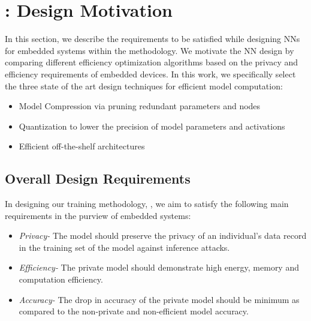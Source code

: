 \section{\method: Design Motivation}\label{motivate}

In this section, we describe the requirements to be satisfied while designing NNs for embedded systems within the \method\hspace{0.02in} methodology.
We motivate the NN design by comparing different efficiency optimization algorithms based on the privacy and efficiency requirements of embedded devices.
In this work, we specifically select the three state of the art design techniques for efficient model computation:
\begin{itemize}
\item Model Compression via pruning redundant parameters and nodes
\item Quantization to lower the precision of model parameters and activations
\item Efficient off-the-shelf architectures
\end{itemize}



\subsection{Overall Design Requirements}

In designing our training methodology, \method, we aim to satisfy the following main requirements in the purview of embedded systems:

\begin{itemize}[leftmargin=*]

\item {\em Privacy-}
The model should preserve the privacy of an individual's data record in the training set of the model against inference attacks.

\item {\em Efficiency-}
The private model should demonstrate high energy, memory and computation efficiency.

\item {\em Accuracy-}
The drop in accuracy of the private model should be minimum as compared to the non-private and non-efficient model accuracy.
\end{itemize}

